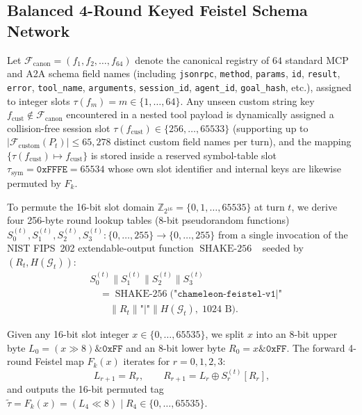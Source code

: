 \documentclass[conference,10pt]{IEEEtran}
\begin{document}
\subsection{Balanced 4-Round Keyed Feistel Schema Network}
Let $\mathcal{F}_{\text{canon}} = (f_1, f_2, \dots, f_{64})$ denote the canonical registry of $64$ standard MCP and A2A schema field names (including \texttt{jsonrpc}, \texttt{method}, \texttt{params}, \texttt{id}, \texttt{result}, \texttt{error}, \texttt{tool\_name}, \texttt{arguments}, \texttt{session\_id}, \texttt{agent\_id}, \texttt{goal\_hash}, etc.), assigned to integer slots $\tau(f_m) = m \in \{1,\dots,64\}$. Any unseen custom string key $f_{\text{cust}} \notin \mathcal{F}_{\text{canon}}$ encountered in a nested tool payload is dynamically assigned a collision-free session slot $\tau(f_{\text{cust}}) \in \{256, \dots, 65533\}$ (supporting up to $|\mathcal{F}_{\text{custom}}(P_t)| \le 65{,}278$ distinct custom field names per turn), and the mapping $\{\tau(f_{\text{cust}}) \mapsto f_{\text{cust}}\}$ is stored inside a reserved symbol-table slot $\tau_{\text{sym}} = \mathtt{0xFFFE} = 65534$ whose own slot identifier and internal keys are likewise permuted by $F_k$.

To permute the 16-bit slot domain $\mathbb{Z}_{2^{16}} = \{0, 1, \dots, 65535\}$ at turn $t$, we derive four 256-byte round lookup tables (8-bit pseudorandom functions) $S_0^{(t)}, S_1^{(t)}, S_2^{(t)}, S_3^{(t)}: \{0,\dots,255\} \to \{0,\dots,255\}$ from a single invocation of the NIST FIPS~202 extendable-output function $\operatorname{SHAKE-256}$~\cite{dworkin2015sha3} seeded by $(R_t, H(\mathcal{G}_t))$:
\begin{equation}
\label{eq:shake_sbox}
\begin{aligned}
&S_0^{(t)} \parallel S_1^{(t)} \parallel S_2^{(t)} \parallel S_3^{(t)} \\
&\quad = \operatorname{SHAKE-256}\Big(\texttt{"chameleon-feistel-v1|"} \\
&\qquad \parallel R_t \parallel \texttt{"|"} \parallel H(\mathcal{G}_t),\; 1024\text{ B}\Big).
\end{aligned}
\end{equation}

Given any 16-bit slot integer $x \in \{0, \dots, 65535\}$, we split $x$ into an 8-bit upper byte $L_0 = (x \gg 8) \mathbin{\&} \mathtt{0xFF}$ and an 8-bit lower byte $R_0 = x \mathbin{\&} \mathtt{0xFF}$. The forward 4-round Feistel map $F_k(x)$ iterates for $r = 0, 1, 2, 3$:
\begin{equation}
\label{eq:feistel_fwd}
L_{r+1} = R_r, \qquad R_{r+1} = L_r \oplus S_r^{(t)}[R_r],
\end{equation}
and outputs the 16-bit permuted tag $\tilde{\tau} = F_k(x) = (L_4 \ll 8) \mid R_4 \in \{0,\dots,65535\}$.
\end{document}
